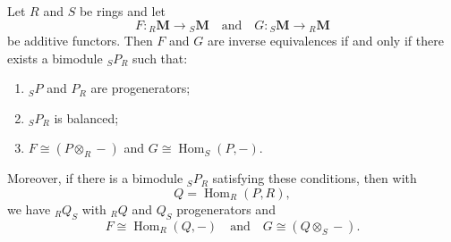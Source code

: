 Let $R$ and $S$ be rings and let
$$F \colon {}_R\mathbf{M} \to {}_S\mathbf{M} \quad \text{and} \quad G \colon {}_S\mathbf{M} \to {}_R\mathbf{M}$$
be additive functors. Then $F$ and $G$ are inverse equivalences if and only if there exists a bimodule ${}_S P_R$ such that:
\begin{enumerate}
\item[(1)] ${}_S P$ and $P_R$ are progenerators;
\item[(2)] ${}_S P_R$ is balanced;
\item[(3)] $F \cong (P \otimes_R -)$ and $G \cong \operatorname{Hom}_S(P, -)$.
\end{enumerate}
Moreover, if there is a bimodule ${}_S P_R$ satisfying these conditions, then with
$$Q = \operatorname{Hom}_R(P, R),$$
we have ${}_R Q_S$ with ${}_R Q$ and $Q_S$ progenerators and
$$F \cong \operatorname{Hom}_R(Q, -) \quad \text{and} \quad G \cong (Q \otimes_S -).$$
